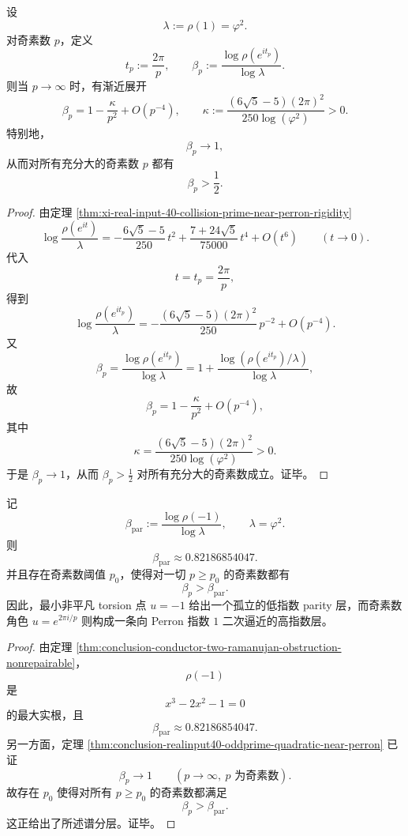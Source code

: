 \begin{theorem}\label{thm:conclusion-realinput40-oddprime-quadratic-near-perron}
设
\[
\lambda:=\rho(1)=\varphi^2.
\]
对奇素数 \(p\)，定义
\[
t_p:=\frac{2\pi}{p},
\qquad
\beta_p:=\frac{\log \rho(e^{it_p})}{\log \lambda}.
\]
则当 \(p\to\infty\) 时，有渐近展开
\[
\beta_p
=
1-\frac{\kappa}{p^2}+O(p^{-4}),
\qquad
\kappa:=
\frac{(6\sqrt5-5)(2\pi)^2}{250\log(\varphi^2)}>0.
\]
特别地，
\[
\beta_p\to 1,
\]
从而对所有充分大的奇素数 \(p\) 都有
\[
\beta_p>\frac12.
\]
\end{theorem}
\begin{proof}
由定理 \ref{thm:xi-real-input-40-collision-prime-near-perron-rigidity}
\[
\log\frac{\rho(e^{it})}{\lambda}
=
-\frac{6\sqrt5-5}{250}\,t^2
+\frac{7+24\sqrt5}{75000}\,t^4
+O(t^6)
\qquad (t\to 0).
\]
代入
\[
t=t_p=\frac{2\pi}{p},
\]
得到
\[
\log\frac{\rho(e^{it_p})}{\lambda}
=
-\frac{(6\sqrt5-5)(2\pi)^2}{250}\,p^{-2}
+O(p^{-4}).
\]
又
\[
\beta_p
=
\frac{\log \rho(e^{it_p})}{\log \lambda}
=
1+\frac{\log(\rho(e^{it_p})/\lambda)}{\log \lambda},
\]
故
\[
\beta_p
=
1-\frac{\kappa}{p^2}+O(p^{-4}),
\]
其中
\[
\kappa=
\frac{(6\sqrt5-5)(2\pi)^2}{250\log(\varphi^2)}>0.
\]
于是 \(\beta_p\to 1\)，从而 \(\beta_p>\frac12\) 对所有充分大的奇素数成立。证毕。
\end{proof}

\begin{corollary}[奇偶角色与奇素数角色的谱分层]\label{cor:conclusion-realinput40-parity-vs-oddprime-spectral-stratification}
记
\[
\beta_{\mathrm{par}}
:=
\frac{\log \rho(-1)}{\log \lambda},
\qquad
\lambda=\varphi^2.
\]
则
\[
\beta_{\mathrm{par}}\approx 0.82186854047.
\]
并且存在奇素数阈值 \(p_0\)，使得对一切 \(p\ge p_0\) 的奇素数都有
\[
\beta_p>\beta_{\mathrm{par}}.
\]
因此，最小非平凡 torsion 点 \(u=-1\) 给出一个孤立的低指数 parity 层，而奇素数角色 \(u=e^{2\pi i/p}\) 则构成一条向 Perron 指数 \(1\) 二次逼近的高指数层。
\end{corollary}
\begin{proof}
由定理 \ref{thm:conclusion-conductor-two-ramanujan-obstruction-nonrepairable}，
\[
\rho(-1)
\]
是
\[
x^3-2x^2-1=0
\]
的最大实根，且
\[
\beta_{\mathrm{par}}\approx 0.82186854047.
\]
另一方面，定理 \ref{thm:conclusion-realinput40-oddprime-quadratic-near-perron} 已证
\[
\beta_p\to 1
\qquad (p\to\infty,\ p\text{ 为奇素数}).
\]
故存在 \(p_0\) 使得对所有 \(p\ge p_0\) 的奇素数都满足
\[
\beta_p>\beta_{\mathrm{par}}.
\]
这正给出了所述谱分层。证毕。
\end{proof}
